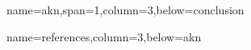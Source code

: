 \documentclass[paperwidth=160cm,paperheight=100cm,landscape,fontscale=0.3010]{baposter}
\begin{document}
\begin{poster}
{}


{name=akn,span=1,column=3,below=conclusion}
{\parskip 5pt

}


{name=references,column=3,below=akn}
{
\renewcommand{\section}[2]{}%
\footnotesize
}



\end{poster}
\end{document}
